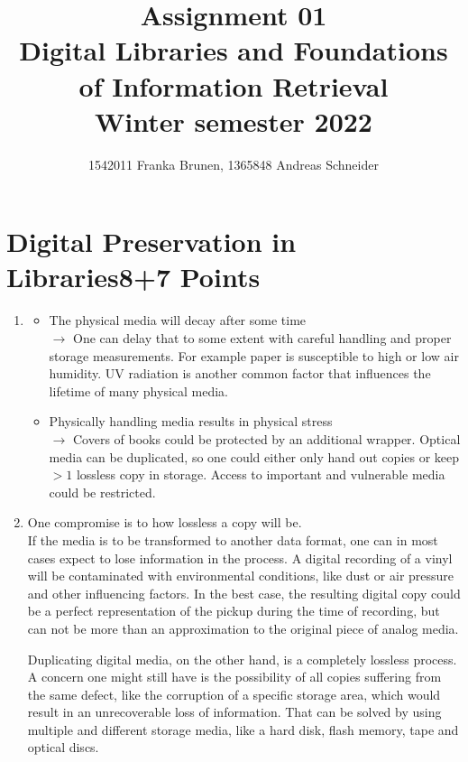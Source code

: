 \documentclass[10pt,a4paper]{article}
\title{ \vspace{-3em}
        Assignment 01\\
		\small{\bf Digital Libraries and Foundations of Information Retrieval}\\
		\small{Winter semester 2022}}
\author{\small{1542011 Franka Brunen}, \small{1365848 Andreas Schneider}}
\date{}
\begin{document}
\setlength{\parskip}{6pt} %
\setlength{\parindent}{0pt}

\leftskip=1cm\rightskip=0.5cm %

\maketitle

\section{\hfill Digital Preservation in Libraries\hfill 8+7 Points}
\begin{enumerate}
    \item \begin{itemize}
        \item The physical media will decay after some time\\
            $\rightarrow$ One can delay that to some extent with careful handling and proper storage measurements. For example paper is susceptible to high or low air humidity. UV radiation is another common factor that influences the lifetime of many physical media.
        \item Physically handling media results in physical stress\\
            $\rightarrow$ Covers of books could be protected by an additional wrapper. Optical media can be duplicated, so one could either only hand out copies or keep $>1$ lossless copy in storage. Access to important and vulnerable media could be restricted.
    \end{itemize}
    
    \item One compromise is to how lossless a copy will be.\\
    If the media is to be transformed to another data format, one can in most cases expect to lose information in the process. A digital recording of a vinyl will be contaminated with environmental conditions, like dust or air pressure and other influencing factors. In the best case, the resulting digital copy could be a perfect representation of the pickup during the time of recording, but can not be more than an approximation to the original piece of analog media.
    
    Duplicating digital media, on the other hand, is a completely lossless process.\\
    A concern one might still have is the possibility of all copies suffering from the same defect, like the corruption of a specific storage area, which would result in an unrecoverable loss of information. That can be solved by using multiple and different storage media, like a hard disk, flash memory, tape and optical discs.
    

\end{enumerate}
\end{document}
